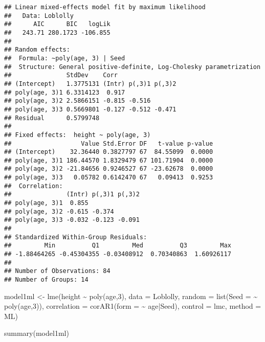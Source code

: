 \documentclass[
]{book}
\newenvironment{Shaded}{\begin{snugshade}}{\end{snugshade}}
\newcommand{\AttributeTok}[1]{\textcolor[rgb]{0.77,0.63,0.00}{#1}}
\newcommand{\DecValTok}[1]{\textcolor[rgb]{0.00,0.00,0.81}{#1}}
\newcommand{\FunctionTok}[1]{\textcolor[rgb]{0.00,0.00,0.00}{#1}}
\newcommand{\NormalTok}[1]{#1}
\newcommand{\OtherTok}[1]{\textcolor[rgb]{0.56,0.35,0.01}{#1}}
\newcommand{\SpecialCharTok}[1]{\textcolor[rgb]{0.00,0.00,0.00}{#1}}
\newcommand{\StringTok}[1]{\textcolor[rgb]{0.31,0.60,0.02}{#1}}
\begin{document}
\begin{verbatim}
## Linear mixed-effects model fit by maximum likelihood
##   Data: Loblolly 
##      AIC      BIC   logLik
##   243.71 280.1723 -106.855
## 
## Random effects:
##  Formula: ~poly(age, 3) | Seed
##  Structure: General positive-definite, Log-Cholesky parametrization
##               StdDev    Corr                
## (Intercept)   1.3775131 (Intr) p(,3)1 p(,3)2
## poly(age, 3)1 6.3314123  0.917              
## poly(age, 3)2 2.5866151 -0.815 -0.516       
## poly(age, 3)3 0.5669801 -0.127 -0.512 -0.471
## Residual      0.5799748                     
## 
## Fixed effects:  height ~ poly(age, 3) 
##                   Value Std.Error DF   t-value p-value
## (Intercept)    32.36440 0.3827797 67  84.55099  0.0000
## poly(age, 3)1 186.44570 1.8329479 67 101.71904  0.0000
## poly(age, 3)2 -21.84656 0.9246527 67 -23.62678  0.0000
## poly(age, 3)3   0.05782 0.6142470 67   0.09413  0.9253
##  Correlation: 
##               (Intr) p(,3)1 p(,3)2
## poly(age, 3)1  0.855              
## poly(age, 3)2 -0.615 -0.374       
## poly(age, 3)3 -0.032 -0.123 -0.091
## 
## Standardized Within-Group Residuals:
##         Min          Q1         Med          Q3         Max 
## -1.88464265 -0.45304355 -0.03408912  0.70340863  1.60926117 
## 
## Number of Observations: 84
## Number of Groups: 14
\end{verbatim}

\begin{Shaded}
\begin{Highlighting}[]
\NormalTok{model1ml }\OtherTok{\textless{}{-}} \FunctionTok{lme}\NormalTok{(height }\SpecialCharTok{\textasciitilde{}} \FunctionTok{poly}\NormalTok{(age,}\DecValTok{3}\NormalTok{), }\AttributeTok{data =}\NormalTok{ Loblolly,}
\AttributeTok{random =} \FunctionTok{list}\NormalTok{(}\AttributeTok{Seed =} \SpecialCharTok{\textasciitilde{}} \FunctionTok{poly}\NormalTok{(age,}\DecValTok{3}\NormalTok{)),}
\AttributeTok{correlation =} \FunctionTok{corAR1}\NormalTok{(}\AttributeTok{form =} \SpecialCharTok{\textasciitilde{}}\NormalTok{ age}\SpecialCharTok{|}\NormalTok{Seed), }\AttributeTok{control =}\NormalTok{ lmc, }\AttributeTok{method =} \StringTok{\textquotesingle{}ML\textquotesingle{}}\NormalTok{)}

\FunctionTok{summary}\NormalTok{(model1ml)}
\end{Highlighting}
\end{Shaded}
\end{document}

